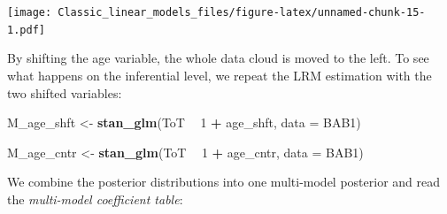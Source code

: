 \documentclass[]{svmono}
\newenvironment{Shaded}{\begin{snugshade}}{\end{snugshade}}
\newcommand{\KeywordTok}[1]{\textcolor[rgb]{0.13,0.29,0.53}{\textbf{#1}}}
\newcommand{\DataTypeTok}[1]{\textcolor[rgb]{0.13,0.29,0.53}{#1}}
\newcommand{\DecValTok}[1]{\textcolor[rgb]{0.00,0.00,0.81}{#1}}
\newcommand{\StringTok}[1]{\textcolor[rgb]{0.31,0.60,0.02}{#1}}
\newcommand{\OperatorTok}[1]{\textcolor[rgb]{0.81,0.36,0.00}{\textbf{#1}}}
\newcommand{\NormalTok}[1]{#1}
\theoremstyle{definition}
\theoremstyle{definition}
\theoremstyle{definition}
\theoremstyle{remark}
\begin{document}
\begin{Shaded}
\end{Shaded}

\texttt{[image: Classic\_linear\_models\_files/figure-latex/unnamed-chunk-15-1.pdf]}

By shifting the age variable, the whole data cloud is moved to the left.
To see what happens on the inferential level, we repeat the LRM
estimation with the two shifted variables:

\begin{Shaded}
\begin{Highlighting}[]
\NormalTok{M_age_shft <-}\StringTok{ }
\StringTok{  }\KeywordTok{stan_glm}\NormalTok{(ToT }\OperatorTok{~}\StringTok{ }\DecValTok{1} \OperatorTok{+}\StringTok{ }\NormalTok{age_shft, }\DataTypeTok{data =}\NormalTok{ BAB1)}

\NormalTok{M_age_cntr <-}\StringTok{ }
\StringTok{  }\KeywordTok{stan_glm}\NormalTok{(ToT }\OperatorTok{~}\StringTok{ }\DecValTok{1} \OperatorTok{+}\StringTok{ }\NormalTok{age_cntr, }\DataTypeTok{data =}\NormalTok{ BAB1)}
\end{Highlighting}
\end{Shaded}

We combine the posterior distributions into one multi-model posterior
and read the \emph{multi-model coefficient table}:
\end{document}
